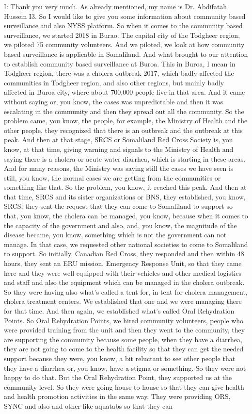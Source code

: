 I: Thank you very much. As already mentioned, my name is Dr. Abdifatah Hussein I3. So I would like to give you some information about community based surveillance and also NYSS platform. So when it comes to the community based surveillance, we started 2018 in Burao. The capital city of the Todgheer region, we piloted 75 community volunteers. And we piloted, we look at how community based surveillance is applicable in Somaliland. And what brought to our attention to establish community based surveillance at Buroa. This in Buroa, I mean in Todgheer region, there was a cholera outbreak 2017, which badly affected the communities in Todgheer region, and also other regions, but mainly badly affected in Buroa city, where about 700,000 people live in that area. And it came without saying or, you know, the cases was unpredictable and then it was escalating in the community and then they spread out all the community. So the problem came, you know, the people, for example, the Ministry of Health and the other people, they recognized that there is an outbreak and the outbreak at this peak. And then at that stage, SRCS or Somaliland Red Cross Society is, you know, at that time, giving warning and signals to the Ministry of Health and saying there is a cholera or acute water diarrhea, which is starting in these areas. And for many reasons, the Ministry was saying still the cases we have seen is still, you know, the normal cases we are getting from the communities or something like that. So the problem, you know, it reached this peak. And then at that time, SRCS and its sister organizations or BNS, they established, you know, SRCS, they sent the request that they can come to Somaliland to support so that, you know, the cholera can be managed, you know, because when it comes to the capacity of the government and also, and, you know, the magnitude of the disease became, you know, something which is not the government can not manage. In that case, we requested other national societies to come to Somaliland to support. So initially, Canadian Red Cross, they responded and then within 48 hours, they sent an ERU mission, Emergency Response Unit, so that they came here and they were well equipped with their vehicles and other medical logistics and staff and also the equipment which can be managed in the cholera outbreak. So they were having also what's called a tent for, in tent for cholera management, cholera treatment centers. We established that one and we were managing there for that time. And then again, we established what's called Oral Rehydration Points. So Oral Rehydration Points, we hired community volunteers, people who were provided training from the unit and then they went to the community, they are supporting the community because some people, when they have a diarrhea, they are not going to come to the health facility so that they can get the needed support because they were, you know, a bit reluctant to see other people that they have a diarrhea or, you know, have a stigma or something. So they were not happy to do that. But the Oral Rehydration Point, they supported us at the community level. So they were going house to house so that they can give health and health promotion activities in the same way. They were providing ORS, SYNC and also and other like aquatabs so that they can 